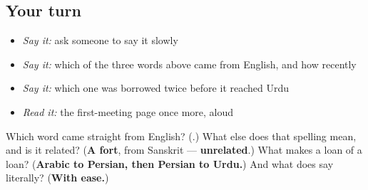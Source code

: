\subsection*{Your turn}
\begin{itemize}
\raggedright
  \item \emph{Say it:} ask someone to say it slowly
  \item \emph{Say it:} which of the three words above came from English, and how recently
  \item \emph{Say it:} which one was borrowed twice before it reached Urdu
  \item \emph{Read it:} the first-meeting page once more, aloud
\end{itemize}

\begin{tcolorbox}[breakable,colback=teal!4,colframe=teal!35!black,title={Before you move on}]
Which word came straight from English? (\textbf{}.) What else does that spelling mean, and is it related? (\textbf{A fort}, from Sanskrit — \textbf{unrelated}.) What makes \textbf{} a loan of a loan? (\textbf{Arabic to Persian, then Persian to Urdu.}) And what does \textbf{ } say literally? (\textbf{With ease.})
\end{tcolorbox}
